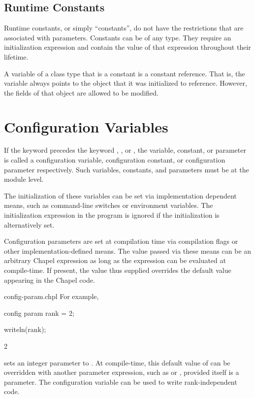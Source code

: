 \subsection{Runtime Constants}
\label{Runtime_Constants}

Runtime constants, or simply ``constants'',
do not have the restrictions that are associated with
parameters.  Constants can be of any type.  They require an initialization
expression and contain the value of that expression throughout their lifetime.

A variable of a class type that is a constant is a constant reference.
That is, the variable always
points to the object that it was initialized to reference.
However, the fields of that object are allowed to be modified.

\section{Configuration Variables}
\label{Configuration_Variables}

If the keyword  precedes the
keyword , , or , the variable,
constant, or parameter is called a configuration variable,
configuration constant, or configuration parameter respectively.  Such
variables, constants, and parameters must be at the module level.

The initialization of these variables can be set via implementation
dependent means, such as command-line switches or environment
variables.  The initialization expression in the program is ignored if
the initialization is alternatively set.

Configuration parameters are set at compilation time via compilation
flags or other implementation-defined means.  The value passed via
these means can be an arbitrary Chapel expression as long as the
expression can be evaluated at compile-time.  If present, the value thus
supplied overrides the default value appearing in the Chapel code.

\begin{chapelexample}{config-param.chpl}
For example,
\begin{chapel}
config param rank = 2;
\end{chapel}
\begin{chapelnoprint}
writeln(rank);
\end{chapelnoprint}
\begin{chapeloutput}
2
\end{chapeloutput}
sets an integer parameter  to .
At compile-time, this default value of  can be overridden
with another parameter expression, such as  or ,
provided  itself is a parameter. The 
configuration variable can be used to write rank-independent code.
\end{chapelexample}


